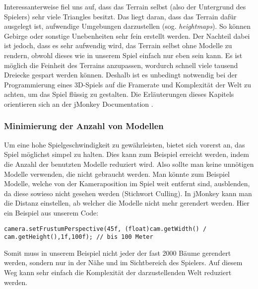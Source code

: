 Interessanterweise fiel uns auf, dass das Terrain selbst (also der Untergrund des Spielers) sehr viele Triangles besitzt. Das liegt daran, dass das Terrain dafür ausgelegt ist, aufwendige Umgebungen darzustellen (sog. \emph{heightmaps}). So können Gebirge oder sonstige Unebenheiten sehr fein erstellt werden. Der Nachteil dabei ist jedoch, dass es sehr aufwendig wird, das Terrain selbst ohne Modelle zu rendern, obwohl dieses wie in unserem Spiel einfach nur eben sein kann. Es ist möglich die Feinheit des Terrains anzupassen, wordurch schnell viele tausend Dreiecke gespart werden können. Deshalb ist es unbedingt notwendig bei der Programmierung eines 3D-Spiels auf die Framerate und Komplexität der Welt zu achten, um das Spiel flüssig zu gestalten. Die Erläuterungen dieses Kapitels orientieren sich an der jMonkey Documentation \cite{BG1}.



\subsubsection{Minimierung der Anzahl von Modellen}
Um eine hohe Spielgeschwindigkeit zu gewährleisten, bietet sich vorerst an, das Spiel möglichst simpel zu halten. Dies kann zum Beispiel erreicht werden, indem die Anzahl der benutzten Modelle reduziert wird. Also sollte man keine unnötigen Modelle verwenden, die nicht gebraucht werden. Man könnte zum Beispiel Modelle, welche von der Kameraposition im Spiel weit entfernt sind, ausblenden, da diese sowieso nicht gesehen werden (Stichwort Culling). In jMonkey kann man die Distanz einstellen, ab welcher die Modelle nicht mehr gerendert werden. Hier ein Beispiel aus unserem Code:


\begin{lstlisting}
camera.setFrustumPerspective(45f, (float)cam.getWidth() / cam.getHeight(),1f,100f); // bis 100 Meter
\end{lstlisting}


Somit muss in unserem Beispiel nicht jeder der fast 2000 Bäume gerendert werden, sondern nur in der Nähe und im Sichtbereich des Spielers. Auf diesem Weg kann sehr einfach die Komplexität der darzustellenden Welt reduziert werden.

